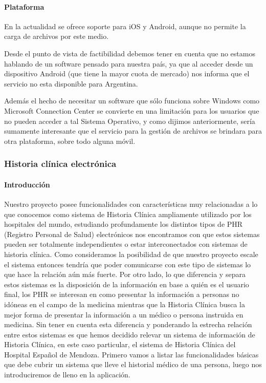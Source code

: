\begin{itemize}
\clearpage
\paragraph{Plataforma}



En la actualidad se ofrece soporte para iOS y Android, aunque no permite la carga de archivos por este medio.

	Desde el punto de vista de factibilidad debemos tener en cuenta que no estamos hablando de un software pensado para nuestra país, ya que al acceder desde un dispositivo Android (que tiene la mayor cuota de mercado)  nos informa que el servicio no esta disponible para Argentina. 
	
	Además el hecho de necesitar un software que sólo funciona sobre Windows como Microsoft Connection Center se convierte en una limitación para los usuarios que no pueden acceder a tal Sistema Operativo, y como dijimos anteriormente, sería sumamente interesante que el servicio para la gestión de archivos se brindara para otra plataforma, sobre todo alguna móvil.
\end{itemize}



\clearpage
\subsubsection{Historia clínica electrónica}


\paragraph{Introducción}
Nuestro proyecto posee funcionalidades con características muy relacionadas a lo que conocemos como sistema de Historia Clínica ampliamente utilizado por los hospitales del mundo, estudiando profundamente los distintos tipos de PHR (Registro Personal de Salud) electrónicos nos encontramos con que estos sistemas pueden ser totalmente independientes o estar interconectados con sistemas de historia clínica. Como consideramos la posibilidad de que nuestro proyecto escale el sistema entonces tendría que poder comunicarse con este tipo de sistemas lo que hace la relación aún más fuerte. Por otro lado, lo que diferencia y separa estos sistemas es la disposición de la información en base a quién es el usuario final, los PHR se interesan en como presentar la información a personas no idóneas en el campo de la medicina mientras que la Historia Clínica busca la mejor forma de presentar la información a un médico o persona instruida en medicina. Sin tener en cuenta esta diferencia y ponderando la estrecha relación entre estos sistemas es que hemos decidido relevar un sistema de información de Historia Clínica, en este caso particular, el sistema de Historia Clínica del Hospital Español de Mendoza.
Primero vamos a listar las funcionalidades básicas que debe cubrir un sistema que lleve el historial médico de una persona, luego nos introduciremos de lleno en la aplicación.


